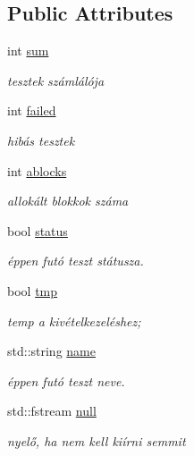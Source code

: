 \subsection*{Public Attributes}
\begin{DoxyCompactItemize}
\item 
int \mbox{\hyperlink{structgtest__lite_1_1_test_a6da678d43b72b9e2bff1c99e1d3c48f5}{sum}}
\begin{DoxyCompactList}\small\item\em tesztek számlálója \end{DoxyCompactList}\item 
int \mbox{\hyperlink{structgtest__lite_1_1_test_a4fb6ee7bd903717d970e3f0504cdeeab}{failed}}
\begin{DoxyCompactList}\small\item\em hibás tesztek \end{DoxyCompactList}\item 
int \mbox{\hyperlink{structgtest__lite_1_1_test_a91d9c63794d2b9b49e0c48d897208560}{ablocks}}
\begin{DoxyCompactList}\small\item\em allokált blokkok száma \end{DoxyCompactList}\item 
bool \mbox{\hyperlink{structgtest__lite_1_1_test_a59a9a7f0ef7867af604ce5678f7a2c13}{status}}
\begin{DoxyCompactList}\small\item\em éppen futó teszt státusza. \end{DoxyCompactList}\item 
bool \mbox{\hyperlink{structgtest__lite_1_1_test_a1145ceb335a60a808b7b4d5d1624b2a5}{tmp}}
\begin{DoxyCompactList}\small\item\em temp a kivételkezeléshez; \end{DoxyCompactList}\item 
std\+::string \mbox{\hyperlink{structgtest__lite_1_1_test_a8d495a42580e3ae337f9c4982136b700}{name}}
\begin{DoxyCompactList}\small\item\em éppen futó teszt neve. \end{DoxyCompactList}\item 
std\+::fstream \mbox{\hyperlink{structgtest__lite_1_1_test_af4784302d78bb004bcb20b7f75ec06c3}{null}}
\begin{DoxyCompactList}\small\item\em nyelő, ha nem kell kiírni semmit \end{DoxyCompactList}\end{DoxyCompactItemize}


